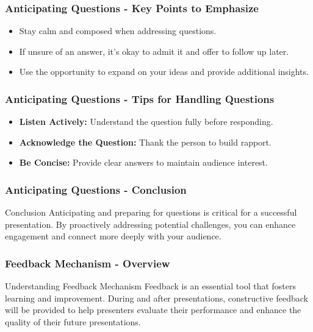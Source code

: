 \documentclass[aspectratio=169]{beamer}
\begin{document}
\begin{frame}[fragile]
    \frametitle{Anticipating Questions - Key Points to Emphasize}
    \begin{itemize}
        \item Stay calm and composed when addressing questions.
        \item If unsure of an answer, it's okay to admit it and offer to follow up later.
        \item Use the opportunity to expand on your ideas and provide additional insights.
    \end{itemize}
\end{frame}

\begin{frame}[fragile]
    \frametitle{Anticipating Questions - Tips for Handling Questions}
    \begin{itemize}
        \item \textbf{Listen Actively:} Understand the question fully before responding.
        \item \textbf{Acknowledge the Question:} Thank the person to build rapport.
        \item \textbf{Be Concise:} Provide clear answers to maintain audience interest.
    \end{itemize}
\end{frame}

\begin{frame}[fragile]
    \frametitle{Anticipating Questions - Conclusion}
    \begin{block}{Conclusion}
        Anticipating and preparing for questions is critical for a successful presentation. By proactively addressing potential challenges, you can enhance engagement and connect more deeply with your audience.
    \end{block}
\end{frame}

\begin{frame}[fragile]
    \frametitle{Feedback Mechanism - Overview}
    \begin{block}{Understanding Feedback Mechanism}
        Feedback is an essential tool that fosters learning and improvement. During and after presentations, constructive feedback will be provided to help presenters evaluate their performance and enhance the quality of their future presentations.
    \end{block}
\end{frame}
\end{document}
